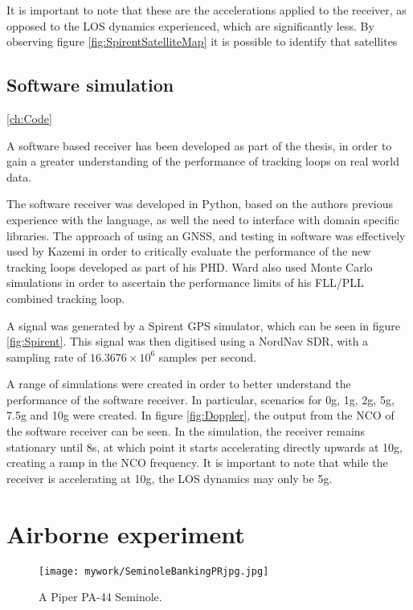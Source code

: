 It is important to note that these are the accelerations applied to the receiver, as opposed to the \ac{LOS} dynamics experienced, which are significantly less. By observing figure \ref{fig:SpirentSatelliteMap} it is possible to identify that satellites 


\subsection{Software simulation}
\ref{ch:Code}

A software based receiver has been developed as part of the thesis, in order to gain a greater understanding of the performance of tracking loops on real world data. 

The software receiver was developed in Python, based on the authors previous experience with the language, as well the need to interface with domain specific libraries.  The approach of using an \ac{GNSS}, and testing in software was effectively used by Kazemi \cite{KazemiPHD} in order to critically evaluate the performance of the new tracking loops developed as part of his PHD. Ward also used Monte Carlo simulations in order to ascertain the performance limits of his FLL/PLL combined tracking loop.

A signal was generated by a Spirent \ac{GPS} simulator, which can be seen in figure \ref{fig:Spirent}. This signal was then digitised using a NordNav \ac{SDR}, with a sampling rate of $16.3676 \times 10^6$ samples per second. 

A range of simulations were created in order to better understand the performance of the software receiver. In particular, scenarios for 0g, 1g, 2g, 5g, 7.5g and 10g were created. In figure \ref{fig:Doppler}, the output from the \ac{NCO} of the software receiver can be seen. In the simulation, the receiver remains stationary until 8s, at which point it starts accelerating directly upwards at 10g, creating a ramp in the \ac{NCO} frequency. It is important to note that while the receiver is accelerating at 10g, the \ac{LOS} dynamics may only be 5g. 


\section{Airborne experiment}

\begin{figure}[!htb] 
    \centering
    \texttt{[image: mywork/SeminoleBankingPRjpg.jpg]} 
    \caption{A Piper PA-44 Seminole.}
    \label{fig:PiperSeminole}
\end{figure}

